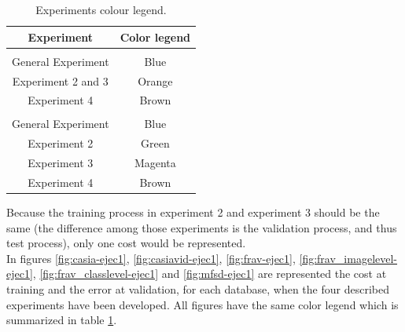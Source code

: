 \begin{table}[t]
\centering
\begin{tabular}{|c|c|}
\hline
\rowcolor[HTML]{ECF4FF}
\textbf{Experiment}           & \textbf{Color legend}          \\ \hline
\rowcolor[HTML]{ECF4FF}
\multicolumn{2}{|c|}{\cellcolor[HTML]{ECF4FF}Training cost}    \\ \hline
General Experiment            & Blue                           \\ \hline
Experiment 2 and 3            & Orange                         \\ \hline
Experiment 4                  & Brown                          \\ \hline
\rowcolor[HTML]{ECF4FF}
\multicolumn{2}{|c|}{\cellcolor[HTML]{ECF4FF}Validation Error} \\ \hline
General Experiment            & Blue                           \\ \hline
Experiment 2                  & Green                          \\ \hline
Experiment 3                  & Magenta                        \\ \hline
Experiment 4                  & Brown                          \\ \hline
\end{tabular}
\caption{Experiments colour legend.}
\label{table:color_legend}
\end{table}

Because the training process in experiment 2 and experiment 3 should be the same (the difference among those experiments is the validation process, and thus test process), only one cost would be represented.\\

In figures \ref{fig:casia-ejec1}, \ref{fig:casiavid-ejec1}, \ref{fig:frav-ejec1}, \ref{fig:frav_imagelevel-ejec1}, \ref{fig:frav_classlevel-ejec1} and \ref{fig:mfsd-ejec1} are represented the cost at training and the error at validation, for each database, when the four described experiments have been developed. All figures have the same color legend which is summarized in table \ref{table:color_legend}.\\

